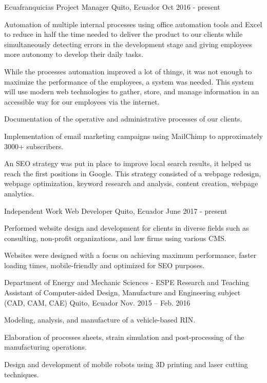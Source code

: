 
\begin{cventries}

  \cventry
    {Ecuafranquicias}
    {Project Manager}
    {Quito, Ecuador}
    {Oct 2016 - present}
    {
      \begin{cvitems}
        \item {Automation of multiple internal processes using oﬀice automation tools and Excel to reduce in half the time needed to deliver the product to our clients while simultaneously detecting errors in the development stage and giving employees more autonomy to develop their daily tasks.}
        \item {While the processes automation improved a lot of things, it was not enough to maximize the performance of the employees, a system was needed. This system will use modern web technologies to gather, store, and manage information in an accessible way for our employees via the internet.}
        \item {Documentation of the operative and administrative processes of our clients.}
        \item {Implementation of email marketing campaigns using MailChimp to approximately 3000+ subscribers.}
        \item {An SEO strategy was put in place to improve local search results, it helped us reach the first positions in Google. This strategy consisted of a webpage redesign, webpage optimization, keyword research and analysis, content creation, webpage analytics.}
      \end{cvitems}
    }

    \cventry
      {Independent Work}
      {Web Developer}
      {Quito, Ecuador}
      {June 2017 - present}
      {
        \begin{cvitems}
          \item {Performed website design and development for clients in diverse fields such as consulting, non-profit organizations, and law firms using various CMS.}
          \item {Websites were designed with a focus on achieving maximum performance, faster loading times, mobile-friendly and optimized for SEO purposes.}
        \end{cvitems}
      }

  \cventry
    {Department of Energy and Mechanic Sciences - ESPE}
    {Research and Teaching Assistant of Computer-aided Design, Manufacture and Engineering subject (CAD, CAM, CAE)	}
    {Quito, Ecuador}
    {Nov. 2015 – Feb. 2016}
    {
      \begin{cvitems}
        \item {Modeling, analysis, and manufacture of a vehicle-based RIN.}
        \item {Elaboration of processes sheets, strain simulation and post-processing of the manufacturing operations.}
        \item {Design and development of mobile robots using 3D printing and laser cutting techniques.}
      \end{cvitems}
    }


\end{cventries}
